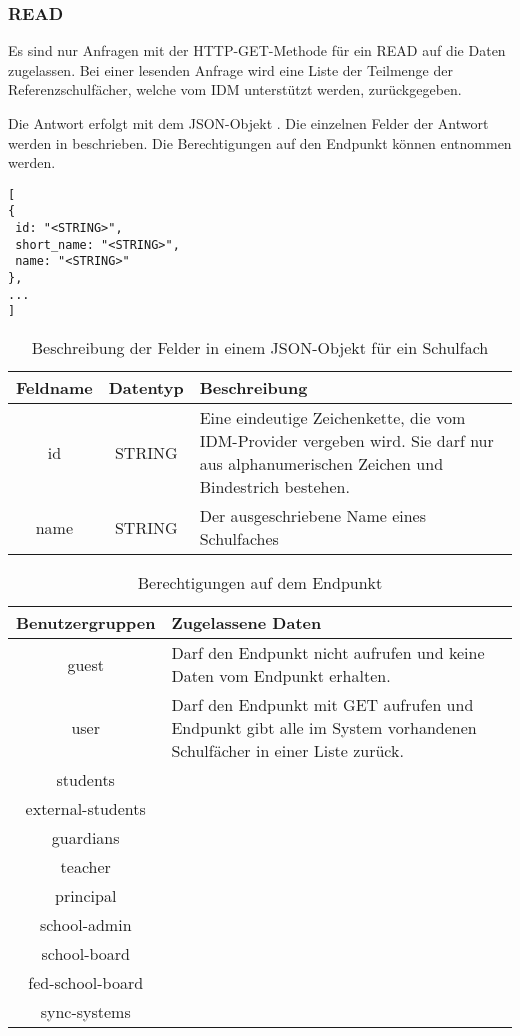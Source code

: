 \subsubsection{READ}
\label{sec:rest:api:school-subjects:read}
Es sind nur Anfragen mit der HTTP-GET-Methode für ein READ auf die Daten zugelassen.
Bei einer lesenden Anfrage wird eine Liste der Teilmenge der Referenzschulfächer, welche vom IDM unterstützt werden, zurückgegeben.

Die Antwort erfolgt mit dem JSON-Objekt . Die einzelnen Felder der Antwort werden in  beschrieben.
Die Berechtigungen auf den Endpunkt können  entnommen werden.

\begin{lstlisting}[caption={JSON-Antwort für einen GET-Aufruf der Route /api/school-subjects},label={lst:code:rest:api:school-subjects:read:ret},frame=tlrb]
[
{
 id: "<STRING>",
 short_name: "<STRING>",
 name: "<STRING>"
},
...
]
\end{lstlisting}
\begin{table}[!htb]
	\begin{tabularx}{\textwidth}{|c|c|X|}
		\hline
			\textbf{Feldname} & \textbf{Datentyp} & \textbf{Beschreibung} \\ \hline
			id & STRING & Eine eindeutige Zeichenkette, die vom IDM-Provider vergeben wird. Sie darf nur aus alphanumerischen Zeichen und Bindestrich bestehen.\\ \hline
			name & STRING & Der ausgeschriebene Name eines Schulfaches \\ \hline
	\end{tabularx}

		\caption{Beschreibung der Felder in einem JSON-Objekt für ein Schulfach}
		\label{tab:rest:api:school-subjects:read:ret:json}
\end{table}
\begin{longtable}{|c|p{}|}
\caption{Berechtigungen auf dem Endpunkt}
\endfoot
		\caption{Berechtigungen auf dem Endpunkt}
		\label{tab:rest:api:school-subjects:read:right}
\endlastfoot 
\hline
\textbf{Benutzergruppen} & \textbf{Zugelassene Daten} \\ \hline
\endhead
guest & Darf den Endpunkt nicht aufrufen und keine Daten vom Endpunkt erhalten. \\ \hline
user & Darf den Endpunkt mit GET aufrufen und Endpunkt gibt alle im System vorhandenen Schulfächer in einer Liste zurück. \\ \hline
students &  \\ \hline
external-students &  \\ \hline
guardians &  \\ \hline
teacher &  \\ \hline
principal &  \\ \hline
school-admin &  \\ \hline
school-board &  \\ \hline
fed-school-board &  \\ \hline
sync-systems &  \\ \hline
	\end{longtable}

